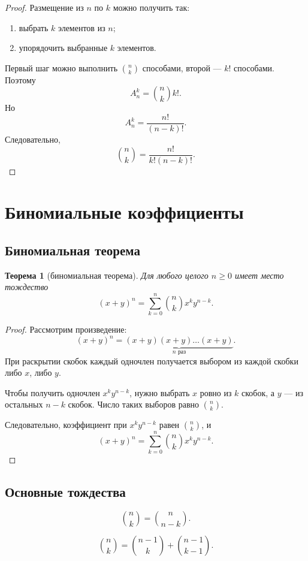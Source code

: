 \documentclass[12pt,a4paper]{article}
\newtheorem{theorem}{Теорема}
\begin{document}
\begin{proof}
Размещение из $n$ по $k$ можно получить так:
\begin{enumerate}
    \item выбрать $k$ элементов из $n$;
    \item упорядочить выбранные $k$ элементов.
\end{enumerate}
Первый шаг можно выполнить $\binom{n}{k}$ способами, второй --- $k!$ способами. Поэтому
\[
A_n^k = \binom{n}{k}k!.
\]
Но
\[
A_n^k = \frac{n!}{(n-k)!}.
\]
Следовательно,
\[
\binom{n}{k} = \frac{n!}{k!(n-k)!}.
\]
\end{proof}

\section{Биномиальные коэффициенты}

\subsection{Биномиальная теорема}

\begin{theorem}[биномиальная теорема]
Для любого целого $n \ge 0$ имеет место тождество
\[
(x+y)^n = \sum_{k=0}^{n} \binom{n}{k} x^k y^{n-k}.
\]
\end{theorem}

\begin{proof}
Рассмотрим произведение:
\[
(x+y)^n = \underbrace{(x+y)(x+y)\dots(x+y)}_{n \text{ раз}}.
\]
При раскрытии скобок каждый одночлен получается выбором из каждой скобки либо $x$, либо $y$.

Чтобы получить одночлен $x^k y^{n-k}$, нужно выбрать $x$ ровно из $k$ скобок, а $y$ --- из остальных $n-k$ скобок. Число таких выборов равно $\binom{n}{k}$.

Следовательно, коэффициент при $x^k y^{n-k}$ равен $\binom{n}{k}$, и
\[
(x+y)^n = \sum_{k=0}^n \binom{n}{k}x^k y^{n-k}.
\]
\end{proof}

\subsection{Основные тождества}

\[
\binom{n}{k} = \binom{n}{n-k}.
\]

\[
\binom{n}{k} = \binom{n-1}{k} + \binom{n-1}{k-1}.
\]
\end{document}
